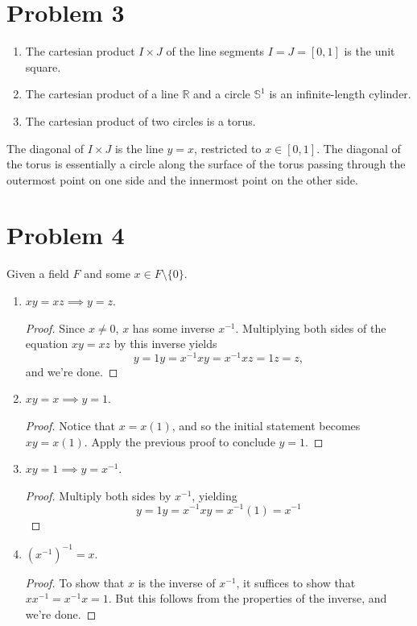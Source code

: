 \documentclass[11pt, oneside]{article}
\newcommand{\R}{\mathbb{R}}
\begin{document}
\section*{Problem 3}
\begin{enumerate}
    \item The cartesian product $I \times J$ of the line segments $I = J = [0, 1]$ is the unit square.
    \item The cartesian product of a line $\R$ and a circle $\mathbb{S}^1$ is an infinite-length cylinder.
    \item The cartesian product of two circles is a torus.
\end{enumerate}
The diagonal of $I \times J$ is the line $y = x$, restricted to $x \in [0, 1]$.
The diagonal of the torus is essentially a circle along the surface of the torus passing through the outermost point on one side and the innermost point on the other side.

\section*{Problem 4}
Given a field $F$ and some $x \in F \setminus \{0\}$.
\begin{enumerate}
    \item $xy = xz \implies y = z$. 
    \begin{proof}
        Since $x \neq 0$, $x$ has some inverse $x^{-1}$. Multiplying both sides of the equation $xy = xz$ by this inverse yields
        $$y = 1y = x^{-1}xy = x^{-1}xz = 1z = z,$$
        and we're done.
    \end{proof}
    \item $xy = x \implies y = 1$.
    \begin{proof}
        Notice that $x = x(1)$, and so the initial statement becomes $xy = x(1)$.
        Apply the previous proof to conclude $y = 1$.
    \end{proof}
    \item $xy = 1 \implies y = x^{-1}$.
    \begin{proof}
        Multiply both sides by $x^{-1}$, yielding
        $$y = 1y = x^{-1}xy = x^{-1}(1) = x^{-1}$$
    \end{proof}
    \item $(x^{-1})^{-1} = x$.
    \begin{proof}
        To show that $x$ is the inverse of $x^{-1}$, it suffices to show that $xx^{-1} = x^{-1}x = 1$. But this follows from the properties of the inverse, and we're done.
    \end{proof}
\end{enumerate}
\end{document}
